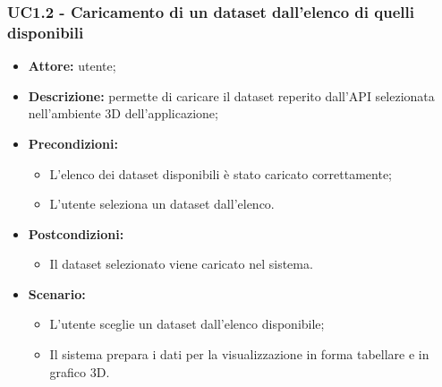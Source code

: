 \subsubsection{UC1.2 - Caricamento di un dataset dall'elenco di quelli disponibili}
\begin{itemize}
    \item \textbf{Attore:} utente;
    \item \textbf{Descrizione:} permette di caricare il dataset reperito dall'API selezionata nell'ambiente 3D dell'applicazione;
    \item \textbf{Precondizioni:}
    \begin{itemize}
        \item L'elenco dei dataset disponibili è stato caricato correttamente;
        \item L'utente seleziona un dataset dall'elenco.
    \end{itemize}
    \item \textbf{Postcondizioni:}
    \begin{itemize}
        \item Il dataset selezionato viene caricato nel sistema.
    \end{itemize}
    \item \textbf{Scenario:}
    \begin{itemize}
        \item L'utente sceglie un dataset dall'elenco disponibile;
        \item Il sistema prepara i dati per la visualizzazione in forma tabellare e in grafico 3D.
    \end{itemize}
\end{itemize}
\newpage
